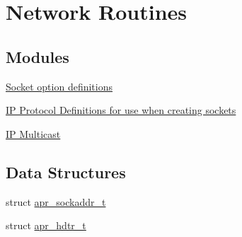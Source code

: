 \hypertarget{group__apr__network__io}{\section{Network Routines}
\label{group__apr__network__io}
}
\subsection*{Modules}
\begin{DoxyCompactItemize}
\item 
\hyperlink{group__apr__sockopt}{Socket option definitions}
\item 
\hyperlink{group___i_p___proto}{I\-P Protocol Definitions for use when creating sockets}
\item 
\hyperlink{group__apr__mcast}{I\-P Multicast}
\end{DoxyCompactItemize}
\subsection*{Data Structures}
\begin{DoxyCompactItemize}
\item 
struct \hyperlink{structapr__sockaddr__t}{apr\-\_\-sockaddr\-\_\-t}
\item 
struct \hyperlink{structapr__hdtr__t}{apr\-\_\-hdtr\-\_\-t}
\end{DoxyCompactItemize}
